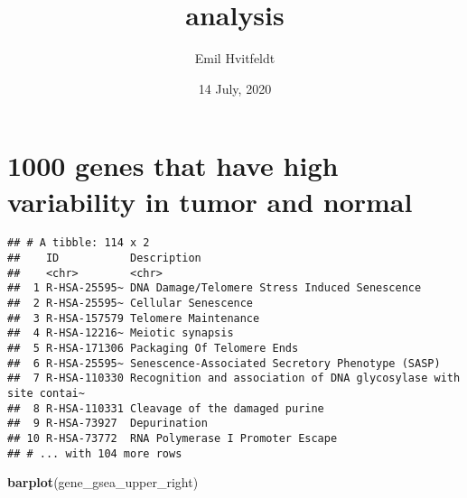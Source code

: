 \documentclass[
]{article}
\title{analysis}
\author{Emil Hvitfeldt}
\date{14 July, 2020}
\newenvironment{Shaded}{\begin{snugshade}}{\end{snugshade}}
\newcommand{\KeywordTok}[1]{\textcolor[rgb]{0.13,0.29,0.53}{\textbf{#1}}}
\newcommand{\NormalTok}[1]{#1}
\newcommand{\OperatorTok}[1]{\textcolor[rgb]{0.81,0.36,0.00}{\textbf{#1}}}
\newcommand{\StringTok}[1]{\textcolor[rgb]{0.31,0.60,0.02}{#1}}
\begin{document}
\maketitle

\hypertarget{genes-that-have-high-variability-in-tumor-and-normal}{%
\section{1000 genes that have high variability in tumor and
normal}\label{genes-that-have-high-variability-in-tumor-and-normal}}

\begin{Shaded}
\end{Shaded}

\begin{verbatim}
## # A tibble: 114 x 2
##    ID           Description                                                     
##    <chr>        <chr>                                                           
##  1 R-HSA-25595~ DNA Damage/Telomere Stress Induced Senescence                   
##  2 R-HSA-25595~ Cellular Senescence                                             
##  3 R-HSA-157579 Telomere Maintenance                                            
##  4 R-HSA-12216~ Meiotic synapsis                                                
##  5 R-HSA-171306 Packaging Of Telomere Ends                                      
##  6 R-HSA-25595~ Senescence-Associated Secretory Phenotype (SASP)                
##  7 R-HSA-110330 Recognition and association of DNA glycosylase with site contai~
##  8 R-HSA-110331 Cleavage of the damaged purine                                  
##  9 R-HSA-73927  Depurination                                                    
## 10 R-HSA-73772  RNA Polymerase I Promoter Escape                                
## # ... with 104 more rows
\end{verbatim}

\begin{Shaded}
\begin{Highlighting}[]
\KeywordTok{barplot}\NormalTok{(gene_gsea_upper_right)}
\end{Highlighting}
\end{Shaded}
\end{document}

